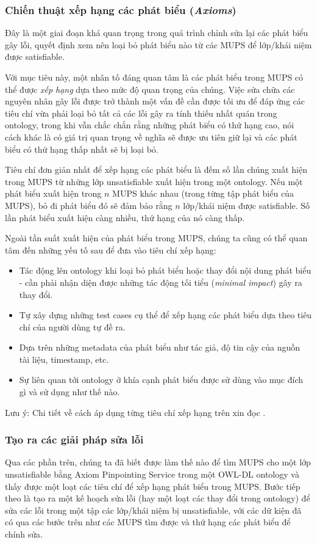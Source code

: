 \subsubsection{Chiến thuật xếp hạng các phát biểu (\textit{Axioms})}
Đây là một giai đoạn khá quan trọng trong quá trình chỉnh sửa lại các phát biểu gây lỗi, quyết định xem nên loại bỏ phát biểu nào từ các MUPS để lớp/khái niệm được satisfiable.

\hspace*{.05\textwidth} Với mục tiêu này, một nhân tố đáng quan tâm là các phát biểu trong MUPS có thể được \textit{xếp hạng} dựa theo mức độ quan trọng của chúng. Việc sửa chữa các nguyên nhân gây lỗi được trở thành một vấn đề cần được tối ưu để đáp ứng các tiêu chí vừa phải loại bỏ tất cả các lỗi gây ra tính thiếu nhất quán trong ontology, trong khi vẫn chắc chắn rằng những phát biểu có thứ hạng cao, nói cách khác là có giá trị quan trọng về nghĩa sẽ được ưu tiên giữ lại và các phát biểu có thứ hạng thấp nhất sẽ bị loại bỏ.

\hspace*{.05\textwidth} Tiêu chí đơn giản nhất để xếp hạng các phát biểu là đếm số lần chúng xuất hiện trong MUPS từ những lớp unsatisfiable xuất hiện trong một ontology. Nếu một phát biểu xuất hiện trong $n$ MUPS khác nhau (trong từng tập phát biểu của MUPS), bỏ đi phát biểu đó sẽ đảm bảo rằng $n$ lớp/khái niệm được satisfiable. Số lần phát biểu xuất hiện càng nhiều, thứ hạng của nó càng thấp.

\hspace*{0.05\textwidth} Ngoài tần suất xuất hiện của phát biểu  trong MUPS, chúng ta cũng có thể quan tâm đến những yếu tố sau để đưa vào tiêu chí xếp hạng:
\begin{itemize}
	\item Tác động lên ontology khi loại bỏ phát biểu hoặc thay đổi nội dung phát biểu - cần phải nhận diện được những tác động tối tiểu (\textit{minimal impact})  gây ra thay đổi.
	\item Tự xây dựng những test cases cụ thể để xếp hạng các phát biểu dựa theo tiêu chí của người dùng tự đề ra.
	\item Dựa trên những metadata của phát biểu như tác giả, độ tin cậy của nguồn tài liệu, timestamp, etc.
	\item Sự liên quan tới ontology ở khía cạnh phát biểu được sử dùng vào mục đích gì và sử dụng như thế nào.
\end{itemize}
Lưu ý: Chi tiết về cách áp dụng từng tiêu chí xếp hạng trên xin đọc \cite{repair}.
\subsubsection{Tạo ra các giải pháp sửa lỗi}
	Qua các phần trên, chúng ta đã biết được làm thế nào để tìm MUPS cho một lớp unsatisfiable bằng Axiom Pinpointing Service trong một OWL-DL ontology và thấy được một loạt các tiêu chí để xếp hạng phát biểu trong MUPS. Bước tiếp theo là tạo ra một kế hoạch sửa lỗi (hay một loạt các thay đổi trong ontology) để sửa các lỗi trong một tập các lớp/khái niệm bị unsatisfiable, với các dữ kiện đã có qua các bước trên như các MUPS tìm được và thứ hạng các phát biểu để chính sửa.
	

